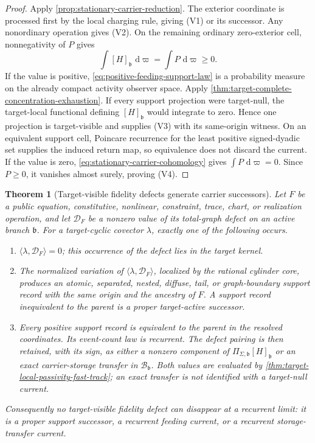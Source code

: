 \documentclass[11pt]{article}
\numberwithin{section}{part}
\theoremstyle{plain}
\newtheorem{theorem}{Theorem}[section]
\theoremstyle{definition}
\theoremstyle{remark}
\newcommand{\dd}{\,\mathrm d}
\begin{document}
\begin{proof}
Apply \cref{prop:stationary-carrier-reduction}.  The exterior coordinate is
processed first by the local charging rule, giving \textup{(V1)} or its
successor.  Any nonordinary operation gives \textup{(V2)}.  On the remaining
ordinary zero-exterior cell, nonnegativity of \(P\) gives
\[
 \int[H]_{\mathfrak b}\,\dd\varpi=\int P\,\dd\varpi\ge0.
\]
If the value is positive, \eqref{eq:positive-feeding-support-law} is a
probability measure on the already compact activity observer space.  Apply
\cref{thm:target-complete-concentration-exhaustion}.  If every support
projection were target-null, the target-local functional defining
\([H]_{\mathfrak b}\) would integrate to zero.  Hence one projection is
target-visible and supplies \textup{(V3)} with its same-origin witness.
On an equivalent support cell, Poincare recurrence for the least positive
signed-dyadic set supplies the induced return map, so equivalence does not
discard the current.
If the value is zero, \eqref{eq:stationary-carrier-cohomology} gives
\(\int P\,\dd\varpi=0\).  Since \(P\ge0\), it vanishes almost surely, proving
\textup{(V4)}.
\end{proof}

\begin{theorem}[Target-visible fidelity defects generate carrier successors]
\label{thm:fidelity-defect-support-successor}
Let \(F\) be a public equation, constitutive, nonlinear, constraint, trace,
chart, or realization operation, and let \(\mathcal D_F\) be a nonzero value
of its total-graph defect on an active branch \(\mathfrak b\).  For a
target-cyclic covector \(\lambda\), exactly one of the following occurs.
\begin{enumerate}[label=\textup{(D\arabic*)}]
\item \(\langle\lambda,\mathcal D_F\rangle=0\); this occurrence of the defect
lies in the target kernel.
\item The normalized variation of
\(\langle\lambda,\mathcal D_F\rangle\), localized by the rational cylinder
core, produces an atomic, separated, nested, diffuse, tail, or graph-boundary
support record with the same origin and the ancestry of \(F\).  A support
record inequivalent to the parent is a proper target-active successor.
\item Every positive support record is equivalent to the parent in the
resolved coordinates.  Its event-count law is recurrent.  The defect pairing
is then retained, with its sign, as either a nonzero component of
\(\Pi_{\Sigma,\mathfrak b}[H]_{\mathfrak b}\) or an exact carrier-storage
transfer in \(\mathscr B_{\mathfrak b}\).  Both values are evaluated by
\cref{thm:target-local-passivity-fast-track}; an exact transfer is not
identified with a target-null current.
\end{enumerate}
Consequently no target-visible fidelity defect can disappear at a recurrent
limit: it is a proper support successor, a recurrent feeding current, or a
recurrent storage-transfer current.
\end{theorem}
\end{document}
